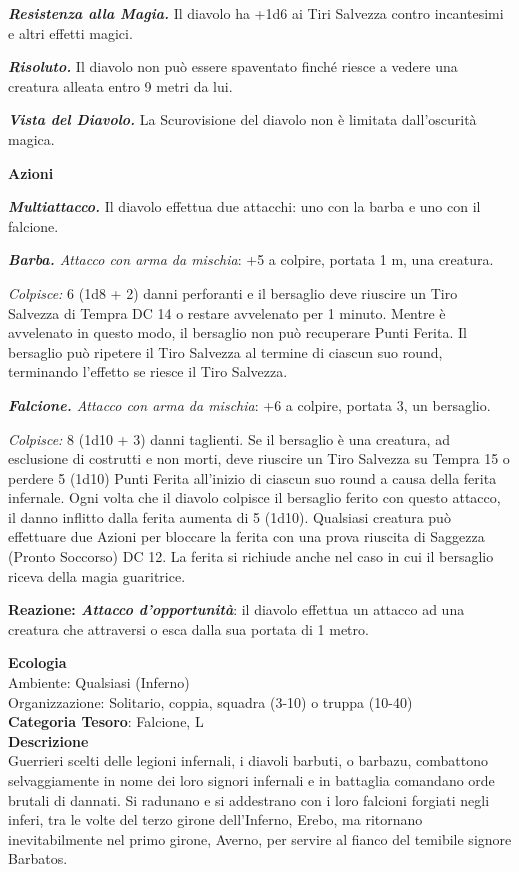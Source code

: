 \begin{multicols}{2}
{\emph{\textbf{Resistenza alla Magia.}} Il diavolo ha +1d6 ai Tiri Salvezza contro incantesimi e altri effetti magici.

\emph{\textbf{Risoluto.}} Il diavolo non può essere spaventato finché riesce a vedere una creatura alleata entro 9 metri da lui.

\emph{\textbf{Vista del Diavolo.}} La Scurovisione del diavolo non è limitata dall'oscurità magica.

\textbf{Azioni}

\emph{\textbf{Multiattacco.}} Il diavolo effettua due attacchi: uno con la barba e uno con il falcione.

\emph{\textbf{Barba.} Attacco con arma da mischia}: +5 a colpire, portata 1 m, una creatura.

\emph{Colpisce:} 6 (1d8 + 2) danni perforanti e il bersaglio deve riuscire un Tiro Salvezza di Tempra DC 14 o restare avvelenato per 1 minuto. Mentre è avvelenato in questo modo, il bersaglio non può recuperare Punti Ferita. Il bersaglio può ripetere il Tiro Salvezza al termine di ciascun suo round, terminando l'effetto se riesce il Tiro Salvezza.

\emph{\textbf{Falcione.} Attacco con arma da mischia}: +6 a colpire, portata 3, un bersaglio.

\emph{Colpisce:} 8 (1d10 + 3) danni taglienti. Se il bersaglio è una creatura, ad esclusione di costrutti e non morti, deve riuscire un Tiro Salvezza su Tempra 15 o perdere 5 (1d10) Punti Ferita all'inizio di ciascun suo round a causa della ferita infernale. Ogni volta che il diavolo colpisce il bersaglio ferito con questo attacco, il danno inflitto dalla ferita aumenta di 5 (1d10). Qualsiasi creatura può effettuare due Azioni per bloccare la ferita con una prova riuscita di Saggezza (Pronto Soccorso) DC 12. La ferita si richiude anche nel caso in cui il bersaglio riceva della magia guaritrice.

\textbf{Reazione: \emph{Attacco d'opportunità}}: il diavolo effettua un attacco ad una creatura che attraversi o esca dalla sua portata di 1 metro.

\textbf{Ecologia}\\
Ambiente: Qualsiasi (Inferno)\\
Organizzazione: Solitario, coppia, squadra (3-10) o truppa (10-40)\\
\textbf{Categoria Tesoro}: Falcione, L\\
\textbf{Descrizione}\\
Guerrieri scelti delle legioni infernali, i diavoli barbuti, o barbazu, combattono selvaggiamente in nome dei loro signori infernali e in battaglia comandano orde brutali di dannati. Si radunano e si addestrano con i loro falcioni forgiati negli inferi, tra le volte del terzo girone dell'Inferno, Erebo, ma ritornano inevitabilmente nel primo girone, Averno, per servire al fianco del temibile signore Barbatos.

}
\end{multicols}
